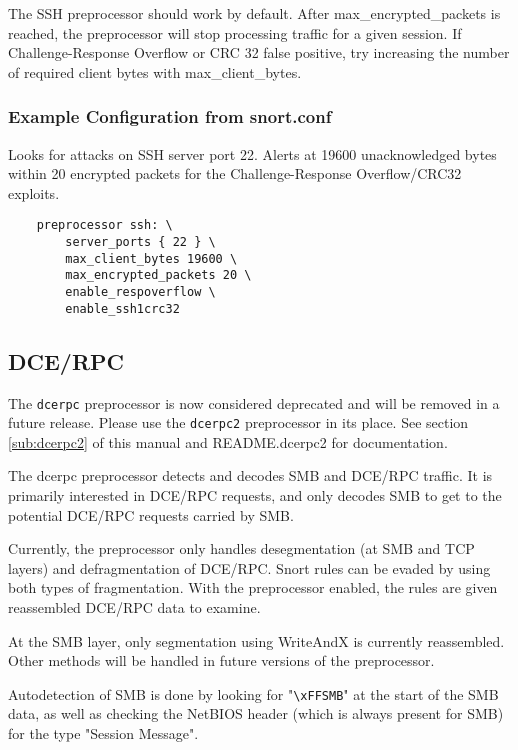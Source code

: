\documentclass[english]{report}
\newenvironment{note}{
\samepage
    \vspace{10pt}{\textsf{
        {\hspace{7pt}\Huge{$\triangle$\hspace{-12.5pt}{\Large{$^!$}}}}\hspace{5pt}
        {\Large{NOTE}}
    }
    }
   \begin{center}
    \par\vspace{-17pt}

    \begin{lrbox}{\savepar}
    \begin{minipage}[r]{6in}
}
{
    \end{minipage}
    \end{lrbox}
    \fbox{
        \usebox{
            \savepar
	}
    }
    \par\vskip10pt
    \end{center}
}
\newenvironment{note}{
        \begin{rawhtml}
        <p><table border="1"><tr><td><b>
        Note:&nbsp;&nbsp;</b>
        \end{rawhtml}
}{
        \begin{rawhtml}
        </b></td></tr></table></p>
        \end{rawhtml}
}
\begin{document}
The SSH preprocessor should work by default.  After max\_encrypted\_packets is
reached, the preprocessor will stop processing traffic for a given session.  If
Challenge-Response Overflow or CRC 32 false positive, try increasing the number
of required client bytes with max\_client\_bytes.

\subsubsection{Example Configuration from snort.conf}

Looks for attacks on SSH server port 22.  Alerts at 19600 unacknowledged bytes
within 20 encrypted packets for the Challenge-Response Overflow/CRC32 exploits.

\begin{verbatim}
    preprocessor ssh: \
        server_ports { 22 } \
        max_client_bytes 19600 \
        max_encrypted_packets 20 \
        enable_respoverflow \
        enable_ssh1crc32
\end{verbatim}

\subsection{DCE/RPC}
\label{sub:dcerpc}

\begin{note}
The \texttt{dcerpc} preprocessor is now considered deprecated and will be removed
in a future release.  Please use the \texttt{dcerpc2} preprocessor in its place.
See section \ref{sub:dcerpc2} of this manual and README.dcerpc2 for documentation.
\end{note}

The dcerpc preprocessor detects and decodes SMB and DCE/RPC traffic.  It is
primarily interested in DCE/RPC requests, and only decodes SMB to get to the
potential DCE/RPC requests carried by SMB.

Currently, the preprocessor only handles desegmentation (at SMB and TCP layers)
and defragmentation of DCE/RPC.  Snort rules can be evaded by using both types
of fragmentation. With the preprocessor enabled, the rules are given
reassembled DCE/RPC data to examine.

At the SMB layer, only segmentation using WriteAndX is currently reassembled.
Other methods will be handled in future versions of the preprocessor.

Autodetection of SMB is done by looking for "\verb!\xFFSMB!" at the start of
the SMB data, as well as checking the NetBIOS header (which is always present
for SMB) for the type "Session Message".
\end{document}
